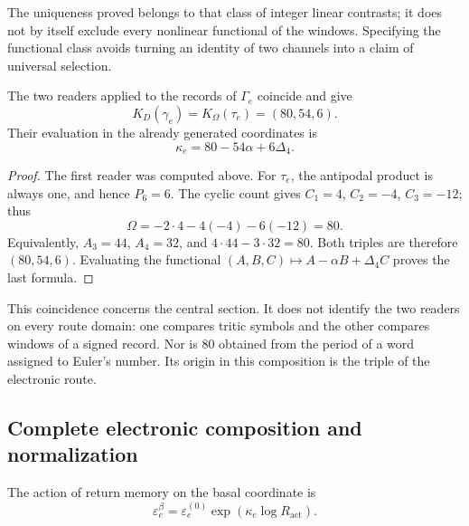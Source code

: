 The uniqueness proved belongs to that class of integer linear
contrasts; it does not by itself exclude every nonlinear functional of the windows.
Specifying the functional class avoids turning an identity
of two channels into a claim of universal selection.

\begin{theorem}
The two readers applied to the records of \(\Gamma_e\)
coincide and give
\begin{equation}
 K_D(\gamma_e)=K_\Omega(\tau_e)=(80,54,6).
 \label{eq:el-triple}
\end{equation}
Their evaluation in the already generated coordinates is
\begin{equation}
 \kappa_e=80-54\alpha+6\Delta_4.
 \label{eq:el-kappa}
\end{equation}
\end{theorem}
\begin{proof}
The first reader was computed above. For \(\tau_e\), the antipodal
product is always one, and hence \(P_6=6\). The cyclic count gives
\(C_1=4\), \(C_2=-4\), \(C_3=-12\); thus
\[
 \Omega=-2\cdot4-4(-4)-6(-12)=80.
\]
Equivalently, \(A_3=44\), \(A_4=32\), and
\(4\cdot44-3\cdot32=80\). Both triples are therefore
\((80,54,6)\). Evaluating the functional
\((A,B,C)\mapsto A-\alpha B+\Delta_4C\) proves the last formula.
\end{proof}

This coincidence concerns the central section. It does not identify
the two readers on every route domain: one compares tritic
symbols and the other compares windows of a signed record. Nor is
\(80\) obtained from the period of a word assigned to Euler's
number. Its origin in this composition is the triple of the electronic
route.

\subsection{Complete electronic composition and normalization}

\begin{definition}
The action of return memory on the basal coordinate is
\begin{equation}
 \varepsilon_e^\beta
 =\varepsilon_e^{(0)}\exp\!\left(\kappa_e\log R_{\mathrm{act}}\right).
 \label{eq:el-beta}
\end{equation}
\end{definition}

